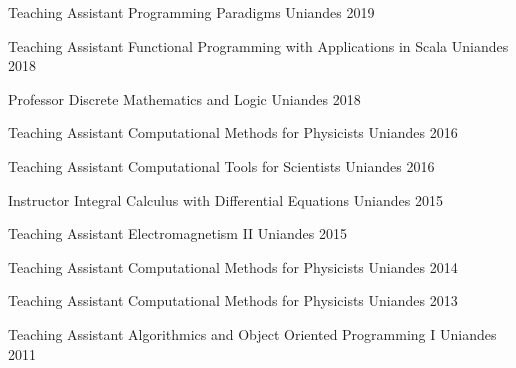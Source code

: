 


\begin{cvhonors}

    \cvhonor
    {Teaching Assistant}
    {Programming Paradigms}
    {Uniandes}
    {2019}
    
    \cvhonor
    {Teaching Assistant}
    {Functional Programming with Applications in Scala}
    {Uniandes}
    {2018}

    \cvhonor
    {Professor}
    {Discrete Mathematics and Logic}
    {Uniandes}
    {2018}

    \cvhonor
    {Teaching Assistant} %
    {Computational Methods for Physicists} %
    {Uniandes} %
    {2016} %

    \cvhonor
    {Teaching Assistant} %
    {Computational Tools for Scientists} %
    {Uniandes} %
    {2016} %

    \cvhonor
    {Instructor} %
    {Integral Calculus with Differential Equations} %
    {Uniandes} %
    {2015} %
    
    \cvhonor
    {Teaching Assistant} %
    {Electromagnetism II} %
    {Uniandes} %
    {2015} %
    
    \cvhonor
    {Teaching Assistant} %
    {Computational Methods for Physicists} %
    {Uniandes} %
    {2014} %

    \cvhonor
    {Teaching Assistant} %
    {Computational Methods for Physicists} %
    {Uniandes} %
    {2013} %

    \cvhonor
    {Teaching Assistant} %
    {Algorithmics and Object Oriented Programming I} %
    {Uniandes} %
    {2011} %

\end{cvhonors}
